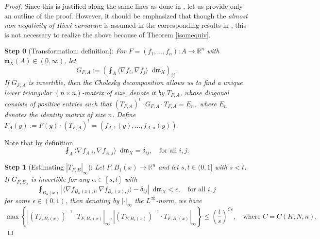 \documentclass[11pt,reqno]{amsart}
\theoremstyle{definition}
\numberwithin{equation}{section}
\newcommand{\di}{\mathop{}\!\mathrm{d}}
\newcommand{\meas}{\mathfrak{m}}
\begin{document}
\begin{proof}
Since this is justified along the same lines as done in \cite{HP}, let us provide only an outline of the proof. However, it should be emphasized that though the {\it almost non-negativity of Ricci curvature} is assumed in the corresponding results in \cite{HP}, this is not necessary to realize the above because of Theorem \ref{isomequiv}. 

\smallskip

\textbf{Step 0} (Transformation: definition): \textit{For $F=(f_1, \ldots, f_n):A \to \mathbb{R}^n$ with $\meas_X(A) \in (0, \infty)$, let
\begin{equation}
    G_{F, A}:=\left(\fint_A\langle \nabla f_i, \nabla f_j\rangle \di \meas_X\right)_{ij}.
\end{equation}
If $G_{F, A}$ is invertible, then the Cholesky decomposition allows us to find a unique lower triangular $(n\times n)$-matrix of size, denote it by $T_{F, A}$, whose diagonal consists of positive entries such that
$
    (T_{F, A})^t \cdot G_{F, A} \cdot T_{F, A}=E_n,
$
where $E_n$ denotes the identity matrix of size $n$. Define
$
    F_A(y):= F(y) \cdot (T_{F, A})^t=(f_{A, 1}(y), \ldots, f_{A, n}(y)).
$
}

\smallskip

Note that by definition
\begin{equation}\label{eq:transf}
    \fint_{A}\langle \nabla f_{A, i}, \nabla f_{A, j}\rangle \di \meas_X=\delta_{ij},\quad \text{for all $i, j$.}
\end{equation}

\smallskip

\textbf{Step 1} (Estimating $|T_{F, B}|_{\infty}$): \textit{Let $F:B_1(x) \to \mathbb{R}^n$ and let $s, t \in (0, 1]$ with $s<t$. If $G_{F, B_{\alpha}}$ is invertible for any $\alpha \in [s, t]$ with 
\begin{equation}
    \fint_{B_{\alpha}(x)}\left|\langle \nabla f_{B_{\alpha}(x), i}, \nabla f_{B_{\alpha}(x), j}\rangle-\delta_{ij}\right|\di \meas_X<\epsilon, \quad \text{for all $i, j$}
\end{equation}
for some $\epsilon \in (0,1)$, then denoting by $|\cdot|_{\infty}$ the $L^{\infty}$-norm, we have
\begin{equation*}
    \max \left\{\left| (T_{F, B_t(x)})^{-1}\cdot T_{F, B_s(x)}\right|_{\infty}, \left| (T_{F, B_s(x)})^{-1}\cdot T_{F, B_t(x)}\right|_{\infty}\right\} \le \left(\frac{t}{s}\right)^{C\epsilon}, \quad \text{where $C=C(K, N, n)$.}
\end{equation*}
}


\end{proof}
\end{document}

